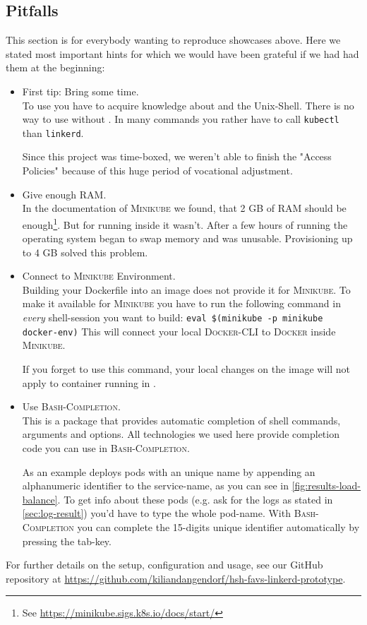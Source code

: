 \subsection{Pitfalls}
This section is for everybody wanting to reproduce showcases above.
Here we stated most important hints for which we would have been grateful if we had had them at the beginning:
\begin{itemize}
	\item First tip: Bring some time.\\
	To use \linkerd{} you have to acquire knowledge about \kubernetes{} and the Unix-Shell.
	There is no way to use \linkerd{} without \kubernetes{}.
	In many commands you rather have to call \lstinline|kubectl| than \lstinline|linkerd|.
	
	Since this project was time-boxed, we weren't able to finish the "Access Policies" because of this huge period of vocational adjustment.
	
	\item Give enough RAM.\\
	In the documentation of \textsc{Minikube} we found, that 2 GB of RAM should be enough\footnote{
		See \url{https://minikube.sigs.k8s.io/docs/start/}
	}.
	But for running \linkerd{} inside it wasn't. 
	After a few hours of running the operating system began to swap memory and \kubernetes{} was unusable. 
	Provisioning up to 4 GB solved this problem.

	\item Connect to \textsc{Minikube} Environment.\\
	Building your Dockerfile into an image does not provide it for \textsc{Minikube}.
	To make it available for \textsc{Minikube} you have to run the following command in \textit{every} shell-session you want to build:
	\lstinline|eval $(minikube -p minikube docker-env)|
	This will connect your local \textsc{Docker}-CLI to \textsc{Docker} inside \textsc{Minikube}.
	
	If you forget to use this command, your local changes on the image will not apply to container running in \kubernetes{}.

	\item Use \textsc{Bash-Completion}.\\
	This is a package that provides automatic completion of shell commands, arguments and options.
	All technologies we used here provide completion code you can use in \textsc{Bash-Completion}.
	
	As an example \kubernetes{} deploys pods with an unique name by appending an alphanumeric identifier to the service-name, as you can see in \autoref{fig:results-load-balance}.
	To get info about these pods (e.g. ask for the logs as stated in \autoref{sec:log-result}) you'd have to type the whole pod-name.
	With \textsc{Bash-Completion} you can complete the 15-digits unique identifier automatically by pressing the tab-key.
	
\end{itemize}

For further details on the setup, configuration and usage, see our GitHub repository at
\url{https://github.com/kiliandangendorf/hsh-favs-linkerd-prototype}.


